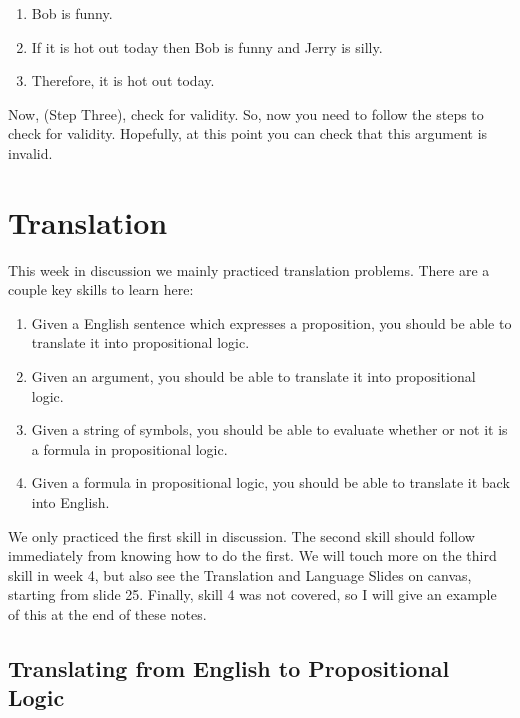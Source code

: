 \documentclass[
]{book}
\providecommand{\tightlist}{%
  \setlength{\itemsep}{0pt}\setlength{\parskip}{0pt}}
\begin{document}
\begin{enumerate}
\def\labelenumi{\arabic{enumi}.}
\tightlist
\item
  Bob is funny.
\item
  If it is hot out today then Bob is funny and Jerry is silly.
\item
  Therefore, it is hot out today.
\end{enumerate}

Now, (Step Three), check for validity. So, now you need to follow the steps to check for validity. Hopefully, at this point you can check that this argument is invalid.

\hypertarget{translation}{%
\chapter{Translation}\label{translation}}

This week in discussion we mainly practiced translation problems. There are a couple key skills to learn here:

\begin{enumerate}
\def\labelenumi{\arabic{enumi}.}
\tightlist
\item
  Given a English sentence which expresses a proposition, you should be able to translate it into propositional logic.
\item
  Given an argument, you should be able to translate it into propositional logic.
\item
  Given a string of symbols, you should be able to evaluate whether or not it is a formula in propositional logic.
\item
  Given a formula in propositional logic, you should be able to translate it back into English.
\end{enumerate}

We only practiced the first skill in discussion. The second skill should follow immediately from knowing how to do the first. We will touch more on the third skill in week 4, but also see the Translation and Language Slides on canvas, starting from slide 25. Finally, skill 4 was not covered, so I will give an example of this at the end of these notes.

\hypertarget{translating-from-english-to-propositional-logic}{%
\section{Translating from English to Propositional Logic}\label{translating-from-english-to-propositional-logic}}
\end{document}
